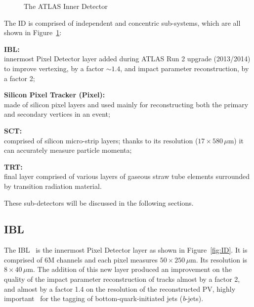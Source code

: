			\begin{figure}[!htb]
				\hfill
				\caption{The \ac{ATLAS} Inner Detector}
				\label{fig:AID}
			\end{figure}


			The \ac{ID} is comprised of independent and concentric sub-systems, which are all shown in Figure~\ref{fig:AID}: %

			\begin{description}
				\item \textbf{\ac{IBL}:} \\innermost Pixel Detector layer added during \ac{ATLAS} Run 2 upgrade (2013/2014) to improve vertexing, by a factor $\sim 1.4$, and impact parameter reconstruction, by a factor 2;
				\item \textbf{Silicon Pixel Tracker (Pixel):} \\made of silicon pixel layers and used mainly for reconstructing both the primary and secondary vertices in an event;
				\item \textbf{\ac{SCT}:} \\comprised of silicon micro-strip layers; thanks to its resolution ($17 \times 580\, \mu$m) it can accurately measure particle momenta;
				\item \textbf{\ac{TRT}:} \\final layer comprised of various layers of gaseous straw tube elements surrounded by transition radiation material.
			\end{description}

			These sub-detectors will be discussed in the following sections.  

			\subsection*{IBL} 
				
				The \ac{IBL}~\cite{IBLTDR} is the innermost Pixel Detector layer as shown in Figure~\ref{fig:ID}. It is comprised of 6M channels and each pixel measures $50 \times 250\,\mu$m. Its resolution is $8 \times 40\, \mu$m. The addition of this new layer produced an improvement on the quality of the impact parameter reconstruction of tracks almost by a factor 2, and almost by a factor 1.4 on the resolution of the reconstructed \ac{PV}, highly important \eg\ for the tagging of bottom-quark-initiated jets (\emph{b}-jets). %

